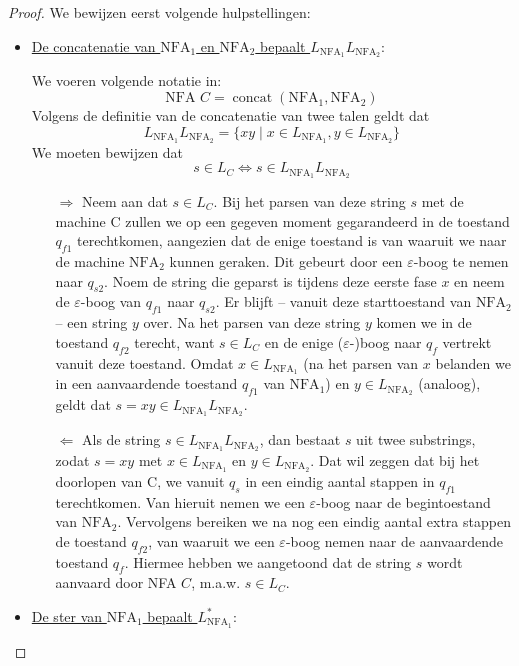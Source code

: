 \documentclass[kulak]{kulakarticle}
\newcommand{\NFA}{\text{NFA}}
\newcommand{\epsilonboog}{\( \varepsilon \)-boog }
\theoremstyle{definition}
\begin{document}
	\begin{proof}
		We bewijzen eerst volgende hulpstellingen:
		\begin{itemize}
			\item \underline{De concatenatie van \( \NFA_1 \) en \( \NFA_2 \) bepaalt \( L_{\NFA_1}L_{\NFA_2} \)}:

			We voeren volgende notatie in: \[ \text{NFA } C = \operatorname*{concat}(\NFA_{1},\NFA_{2}) \] Volgens de definitie van de concatenatie van twee talen geldt dat \[ L_{\NFA_1}L_{\NFA_2}=\{xy \mid x \in L_{\NFA_1}, y \in L_{\NFA_2}\} \] We moeten bewijzen dat \[ s \in L_{C} \Leftrightarrow s \in L_{\NFA_1}L_{\NFA_2} \]
			\begin{enumerate}
				\item[\( \Rightarrow \)] Neem aan dat \( s \in L_C \). Bij het parsen van deze string \( s \) met de machine C zullen we op een gegeven moment gegarandeerd in de toestand \(q_{f1}\) terechtkomen, aangezien dat de enige toestand is van waaruit we naar de machine \( \NFA_2 \) kunnen geraken. Dit gebeurt door een \epsilonboog  te nemen naar \( q_{s2} \). Noem de string die geparst is tijdens deze eerste fase \(x\) en neem de \epsilonboog van \( q_{f1} \) naar \( q_{s2} \). Er blijft -- vanuit deze starttoestand van \( \NFA_2 \) -- een string \( y \) over. Na het parsen van deze string \( y \) komen we in de toestand \( q_{f2} \) terecht, want \( s \in L_C \) en de enige (\(\varepsilon\)-)boog naar \( q_f \) vertrekt vanuit deze toestand. Omdat \( x \in L_{\NFA_1} \) (na het parsen van \( x \) belanden we in een aanvaardende toestand \( q_{f1} \) van \( \NFA_1 \)) en \( y \in L_{\NFA_2} \) (analoog), geldt dat \( s = xy \in L_{\NFA_1}L_{\NFA_2} \).
				\item[\(\Leftarrow\)] Als de string \( s \in L_{\NFA_1}L_{\NFA_2} \), dan bestaat \( s \) uit twee substrings, zodat \( s=xy \) met \( x \in L_{\NFA_1} \) en \( y \in L_{\NFA_2} \). Dat wil zeggen dat bij het doorlopen van C, we vanuit \( q_s \) in een eindig aantal stappen in \( q_{f1} \) terechtkomen. Van hieruit nemen we een \epsilonboog naar de begintoestand van \( \NFA_2 \). Vervolgens bereiken we na nog een eindig aantal extra stappen de toestand \(q_{f2}\), van waaruit we een \epsilonboog nemen naar de aanvaardende toestand \(q_f\). Hiermee hebben we aangetoond dat de string \(s\) wordt aanvaard door NFA \(C\), m.a.w. \(s \in L_{C}.\)
			\end{enumerate}

			\item \underline{De ster van \( \NFA_1 \) bepaalt \( L_{\NFA_1}^* \)}:


\end{itemize}
\end{proof}
\end{document}
